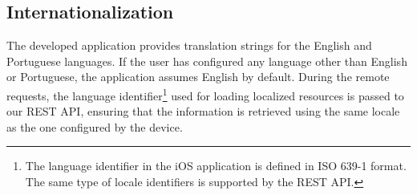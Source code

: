 \subsection{Internationalization}
\label{subsec:iosInternationalization}
The developed application provides translation strings for the English and Portuguese languages. If the user has configured any language other than English or Portuguese, the application assumes English by default. During the remote requests, the language identifier\footnote{The language identifier in the iOS application is defined in ISO 639-1 format. The same type of locale identifiers is supported by the REST API.} used for loading localized resources is passed to our REST API, ensuring that the information is retrieved using the same locale as the one configured by the device.

